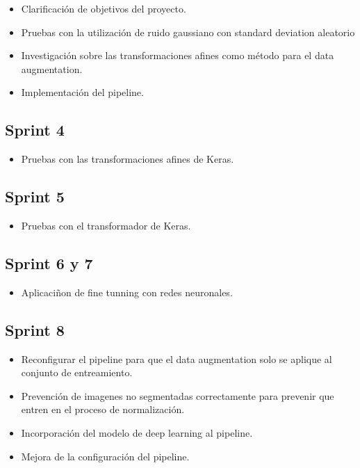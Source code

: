 \begin{itemize}
\item Clarificación de objetivos del proyecto.
\item Pruebas con la utilización de ruido gaussiano con standard deviation aleatorio
\item Investigación sobre las transformaciones afines como método para el data augmentation.
\item Implementación del pipeline.
\end{itemize}

\subsection{Sprint 4}

\begin{itemize}
\item Pruebas con las transformaciones afines de Keras.
\end{itemize}

\subsection{Sprint 5}

\begin{itemize}
\item Pruebas con el transformador de Keras.
\end{itemize}

\subsection{Sprint 6 y 7}

\begin{itemize}
\item Aplicaciñon de fine tunning con redes neuronales.
\end{itemize}

\subsection{Sprint 8}

\begin{itemize}
\item Reconfigurar el pipeline para que el data augmentation solo se aplique al conjunto de entreamiento.
\item Prevención de imagenes no segmentadas correctamente para prevenir que entren en el proceso de normalización.
\item Incorporación del modelo de deep learning al pipeline.
\item Mejora de la configuración del pipeline.
\end{itemize}

